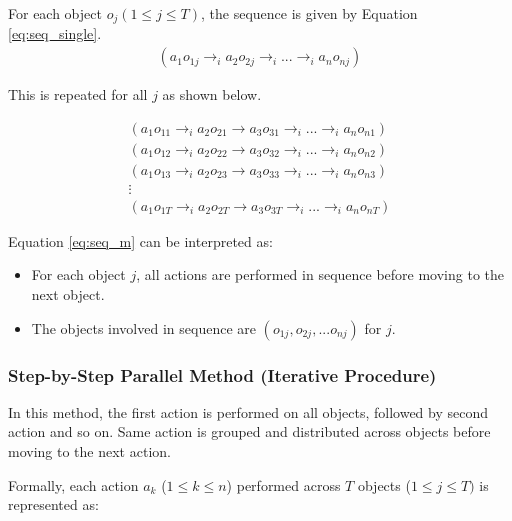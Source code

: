\documentclass[a4paper,11pt]{lmcs}
\begin{document}
For each object $o_j (1 \leq j \leq T)$, the sequence is given by Equation \ref{eq:seq_single}.
\begin{eqnarray}
 \label{eq:seq_single}
 (a_1o_{1j} \rightarrow_i a_2o_{2j} \rightarrow_i... \rightarrow_i a_no_{nj})
\end{eqnarray}

This is repeated for all $j$ as shown below.

\begin{eqnarray}
\label{eq:seq_m}
(a_{1} o_{11} \rightarrow_i a_2 o_{21} \rightarrow a_3 o_{31} \rightarrow_i ... \rightarrow_i a_n o_{n1}) \\
(a_{1} o_{12} \rightarrow_i a_2 o_{22} \rightarrow a_3 o_{32} \rightarrow_i ... \rightarrow_i a_n o_{n2}) \nonumber \\
(a_{1} o_{13} \rightarrow_i a_2 o_{23} \rightarrow a_3 o_{33} \rightarrow_i ... \rightarrow_i a_n o_{n3}) \nonumber \\
\vdots \nonumber \\
(a_{1} o_{1T} \rightarrow_i a_2 o_{2T} \rightarrow a_3 o_{3T} \rightarrow_i ... \rightarrow_i a_n o_{nT}) \nonumber
\end{eqnarray}

Equation \ref{eq:seq_m} can be interpreted as:
\begin{itemize}
 \item For each object $j$, all actions are performed in sequence before moving to the next object.
 \item The objects involved in sequence are $(o_{1j},o_{2j},...o_{nj})$ for $j$.
\end{itemize}

\subsubsection{Step-by-Step Parallel Method (Iterative Procedure)}
In this method, the first action is performed on all objects, followed by second action and so on. Same action is grouped and distributed across objects before moving to the next action.

Formally, each action $a_k$ ($1 \leq k \leq n$) performed across $T$ objects ($1 \leq j \leq T)$ is represented as:
\end{document}
